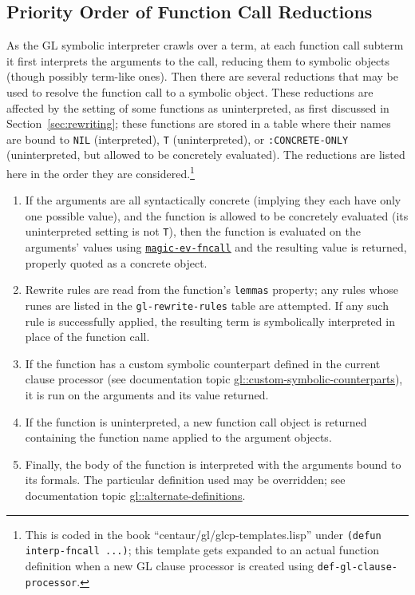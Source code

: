 \documentclass[submission,copyright,creativecommons]{eptcs}
\begin{document}
\subsection{Priority Order of Function Call Reductions}
As the GL symbolic interpreter crawls over a term, at each function
call subterm it first interprets the arguments to the call, reducing
them to symbolic objects (though possibly term-like ones).  Then there
are several reductions that may be used to resolve the function call
to a symbolic object.  These reductions are affected by the setting of
some functions as uninterpreted, as first discussed in
Section~\ref{sec:rewriting}; these functions are stored in a table
where their names are bound to \texttt{NIL} (interpreted),
\texttt{T} (uninterpreted), or \texttt{:CONCRETE-ONLY} (uninterpreted,
but allowed to be concretely evaluated).  The reductions are listed
here in the order they are considered.\footnote{This is coded in the
  book ``centaur/gl/glcp-templates.lisp'' under \texttt{(defun
    interp-fncall ...)}; this template gets expanded to an actual
  function definition when a new GL clause processor is created using
  \texttt{def-gl-clause-processor}.}
\begin{enumerate}
\item If the arguments are all syntactically concrete (implying they
  each have only one possible value), and the function is allowed to
  be concretely evaluated (its uninterpreted setting is not
  \texttt{T}), then the
  function is evaluated on the arguments' values using \href{http://www.cs.utexas.edu/users/moore/acl2/manuals/current/manual/?topic=ACL2____MAGIC-EV-FNCALL}{\underline{\texttt{magic-ev-fncall}}} and the resulting value is returned, properly quoted as a concrete object.
\item Rewrite rules are read from the function's \texttt{lemmas}
  property; any rules whose runes are listed in the
  \texttt{gl-rewrite-rules} table are attempted.  If any such rule is
  successfully applied, the resulting term is symbolically interpreted
  in place of the function call.
\item If the function has a custom symbolic counterpart defined in the
  current clause processor \cite{gl-diss} (see documentation topic
  \href{http://www.cs.utexas.edu/users/moore/acl2/manuals/current/manual/?topic=GL____CUSTOM-SYMBOLIC-COUNTERPARTS}{\underline{gl::custom-symbolic-counterparts}}),
  it is run on the arguments and its value returned.
\item If the function is uninterpreted, a new function call object is
  returned containing the function name applied to the argument
  objects.
\item Finally, the body of the function is interpreted with the
  arguments bound to its formals.  The particular definition used may
  be overridden; see documentation topic
  \href{http://www.cs.utexas.edu/users/moore/acl2/manuals/current/manual/?topic=GL____ALTERNATE-DEFINITIONS}{\underline{gl::alternate-definitions}}.
\end{enumerate}
\end{document}
